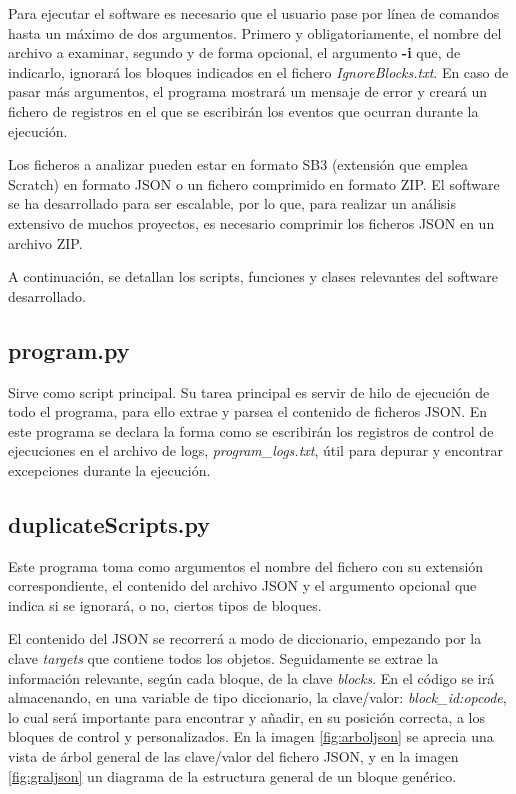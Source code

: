 \documentclass[a4paper, 12pt]{book}
\begin{document}
Para ejecutar el software es necesario que el usuario pase por línea de comandos hasta un máximo de dos argumentos. Primero y obligatoriamente, el nombre del archivo a examinar, segundo y de forma opcional, el argumento \textbf{-i} que, de indicarlo, ignorará los bloques indicados en el fichero \textit{IgnoreBlocks.txt}. En caso de pasar más argumentos, el programa mostrará un mensaje de error y creará un fichero de registros en el que se escribirán los eventos que ocurran durante la ejecución.

Los ficheros a analizar pueden estar en formato SB3 (extensión que emplea Scratch) en formato JSON o un fichero comprimido en formato ZIP. El software se ha desarrollado para ser escalable, por lo que, para realizar un análisis extensivo de muchos proyectos, es necesario comprimir los ficheros JSON en un archivo ZIP. 

A continuación, se detallan los scripts, funciones y clases relevantes del software desarrollado.

\subsection{program.py}

Sirve como script principal. Su tarea principal es servir de hilo de ejecución de todo el programa, para ello extrae y parsea el contenido de ficheros JSON. En este programa se declara la forma como se escribirán los registros de control de ejecuciones en el archivo de logs, \textit{program\_logs.txt}, útil para depurar y encontrar excepciones durante la ejecución.

\subsection{duplicateScripts.py}

Este programa toma como argumentos el nombre del fichero con su extensión correspondiente, el contenido del archivo JSON y el argumento opcional que indica si se ignorará, o no, ciertos tipos de bloques.

El contenido del JSON se recorrerá a modo de diccionario, empezando por la clave \textit{targets} que contiene todos los objetos. Seguidamente se extrae la información relevante, según cada bloque, de la clave \textit{blocks}. En el código se irá almacenando, en una variable de tipo diccionario, la clave/valor: \textit{block\_id:opcode}, lo cual será importante para encontrar y añadir, en su posición correcta, a los bloques de control y personalizados. En la imagen \ref{fig:arboljson} se aprecia una vista de árbol general de las clave/valor del fichero JSON, y en la imagen \ref{fig:graljson} un diagrama de la estructura general de un bloque genérico.
\end{document}
